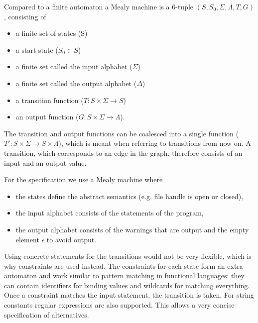 Compared to a finite automaton a Mealy machine is a 6-tuple $(S, S_0, \Sigma, \Lambda, T, G)$, consisting of
\begin{itemize}
\item a finite set of states (S)
\item a start state ($S_0 \in S$)
\item a finite set called the input alphabet ($\Sigma$)
\item a finite set called the output alphabet ($\Delta$)
\item a transition function ($T : S \times \Sigma \rightarrow S$)
\item an output function ($G : S \times \Sigma \rightarrow \Lambda$).
\end{itemize}
The transition and output functions can be coalesced into a single function ($T' : S \times \Sigma \rightarrow S \times \Lambda$), which is meant when referring to transitions from now on.
A transition, which corresponds to an edge in the graph, therefore consists of an input and an output value.

For the specification we use a Mealy machine where
\begin{itemize}
\item the states define the abstract semantics (e.g. file handle is open or closed),
\item the input alphabet consists of the statements of the program,
\item the output alphabet consists of the warnings that are output and the empty element $\epsilon$ to avoid output.
\end{itemize}
Using concrete statements for the transitions would not be very flexible, which is why constraints are used instead. The constraints for each state form an extra automaton and work similar to pattern matching in functional languages: they can contain identifiers for binding values and wildcards for matching everything. Once a constraint matches the input statement, the transition is taken. For string constants regular expressions are also supported.
This allows a very concise specification of alternatives.




